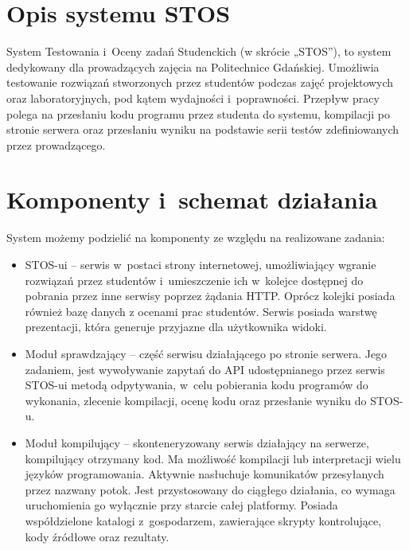 \section{Opis systemu STOS}
\indent System Testowania i~Oceny zadań Studenckich (w skrócie „STOS”), to system dedykowany dla prowadzących zajęcia na Politechnice Gdańskiej. Umożliwia testowanie rozwiązań stworzonych przez studentów podczas zajęć projektowych oraz laboratoryjnych, pod kątem wydajności i~poprawności. Przepływ pracy polega na przesłaniu kodu programu przez studenta do systemu, kompilacji po stronie serwera oraz przesłaniu wyniku na podstawie serii testów zdefiniowanych przez prowadzącego.

\section{Komponenty i~schemat działania}
System możemy podzielić na komponenty ze względu na realizowane zadania:
\begin{itemize}
    \item STOS-ui -- serwis w~postaci strony internetowej, umożliwiający wgranie rozwiązań przez studentów i~umieszczenie ich w~kolejce dostępnej do pobrania przez inne serwisy poprzez żądania HTTP. Oprócz kolejki posiada również bazę danych z ocenami prac studentów. Serwis posiada warstwę prezentacji, która generuje przyjazne dla użytkownika widoki.
    \item Moduł sprawdzający -- część serwisu działającego po stronie serwera. Jego zadaniem, jest wywoływanie zapytań do API udostępnianego przez serwis STOS-ui metodą odpytywania, w~celu pobierania kodu programów do wykonania, zlecenie kompilacji, ocenę kodu oraz przesłanie wyniku do STOS-u.
    \item Moduł kompilujący -- skonteneryzowany serwis działający na serwerze, kompilujący otrzymany kod. Ma możliwość kompilacji lub interpretacji wielu języków programowania. Aktywnie nasłuchuje komunikatów przesyłanych przez nazwany potok. Jest przystosowany do ciągłego działania, co wymaga uruchomienia go wyłącznie przy starcie całej platformy. Posiada współdzielone katalogi z~gospodarzem, zawierające skrypty kontrolujące, kody źródłowe oraz rezultaty.
\end{itemize}
